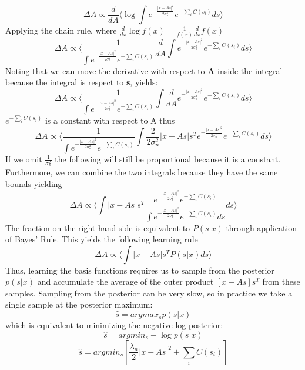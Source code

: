\documentclass{article}
\begin{document}
\newcommand{\pxss}{e^{-\frac{|x - As|^2}{2\sigma_n^2}}e^{-\sum_i C(s_i)}}

\begin{equation}
    \Delta A \propto \frac{d}{dA} \langle \log\int{\pxss ds} \rangle
\end{equation}
Applying the chain rule, where $\frac{d}{dx}\log f(x) = \frac{1}{f(x)}\frac{d}{dx}f(x)$
\begin{equation}
    \Delta A \propto \langle \frac{1}{\int\pxss}\frac{d}{dA}\int{\pxss ds} \rangle
\end{equation}
Noting that we can move the derivative with respect to \textbf{A} inside the integral because the integral is respect to \textbf{s}, yields:
\begin{equation}
    \Delta A \propto \langle \frac{1}{\int\pxss}\int\frac{d}{dA}\pxss ds \rangle
\end{equation}
$e^{-\sum_i C(s_i)}$ is a constant with respect to A thus
\begin{equation}
    \Delta A \propto \langle\frac{1}{\int\pxss}\int{\frac{2}{2\sigma_n^2}|x - As|s^T\pxss ds}\rangle
\end{equation}
If we omit $\frac{1}{\sigma_n^2}$ the following will still be proportional because it is a constant. Furthermore, we can combine the two integrals because they have the same bounds yielding
\begin{equation}
    \Delta A \propto \langle \int{|x - As|s^T\frac{\pxss}{\int\pxss ds} ds} \rangle
\end{equation}
The fraction on the right hand side is equivalent to $P(s|x)$ through application of Bayes' Rule. This yields the following learning rule
\begin{equation}
    \Delta A \propto \langle \int{|x - As|s^TP(s|x)ds}\rangle
\end{equation}
Thus, learning the basis functions requires us to sample from the posterior $p(s|x)$ and accumulate the average of the outer product $[x - As]s^T$ from these samples. Sampling from the posterior can be very slow, so in practice we take a single sample at the posterior maximum:
\begin{equation}
    \hat{s} = argmax_{s}p(s|x)
\end{equation}
which is equivalent to minimizing the negative log-posterior:
\begin{equation}
    \hat{s} = argmin_{s}-\log{p(s|x)}
\end{equation}
\begin{equation}
    \hat{s} = argmin_{s}[\frac{\lambda_n}{2}|x - As|^2 + \sum_{i}C(s_i)]
\end{equation}
\end{document}
